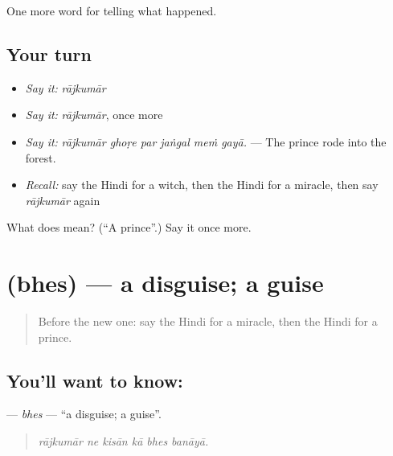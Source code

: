 \begin{grammarlens}[title={What you've built}]
One more word for telling what happened.
\end{grammarlens}

\subsection*{Your turn}
\begin{itemize}
\raggedright
  \item \emph{Say it:} \emph{rājkumār}
  \item \emph{Say it:} \emph{rājkumār}, once more
  \item \emph{Say it:} \emph{rājkumār ghoṛe par jaṅgal meṁ gayā.} — The prince rode into the forest.
  \item \emph{Recall:} say the Hindi for a witch, then the Hindi for a miracle, then say \emph{rājkumār} again
\end{itemize}

\begin{tcolorbox}[breakable,colback=teal!4,colframe=teal!35!black,title={Before you move on}]
What does  mean? (\textquotedblleft{}A prince\textquotedblright{}.) Say it once more.
\end{tcolorbox}
\section[\texorpdfstring{\hi{भेस} (bhes)}{भेस (bhes)}]{ (bhes) — a disguise; a guise}

\label{lesson:HI-C339-bhes}



\begin{quote}
Before the new one: say the Hindi for a miracle, then the Hindi for a prince.
\end{quote}

\subsection*{You'll want to know: }
\textbf{} — \emph{bhes} — \textquotedblleft{}a disguise; a guise\textquotedblright{}.

\begin{quote}
     
\end{quote}

\begin{quote}
\emph{rājkumār ne kisān kā bhes banāyā.}
\end{quote}

